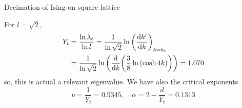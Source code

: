 \documentclass[../main/main.tex]{subfiles}
\begin{document}
\begin{example}{Decimation of Ising on square lattice}{}
\begin{enumerate}
For \( l = \sqrt{2}  \),
\begin{equation}
\begin{split}
Y_t  &= \frac{\ln{\lambda _t} }{\ln{l} } = \frac{1}{\ln{\sqrt{2} } } \ln{\qty(\dv{k'}{k})_{k=k_c} }   \\
& = \frac{1}{\ln{\sqrt{2} } }  \ln{\qty(\dv{}{k} \qty(\frac{3}{8} \ln{(\cosh 4k)} ) ) } = 1.070
\end{split}
\end{equation}
so, this is actual a relevant eigenvalue.
We have also the critical exponents
\begin{equation}
  \nu = \frac{1}{Y_t} = 0.9345, \quad \alpha = 2 - \frac{d}{Y_t} = 0.1313
\end{equation}
\end{enumerate}

\end{example}
\end{document}
